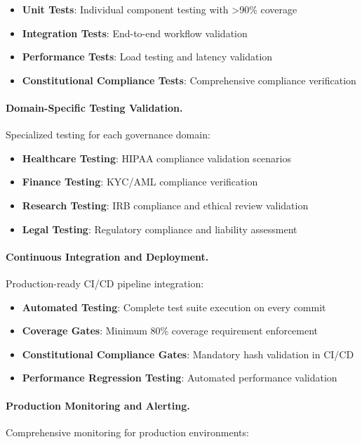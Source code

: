 \documentclass[manuscript,screen,9pt]{acmart}
\begin{document}
\begin{itemize}[itemsep=1pt,parsep=1pt]
    \item \textbf{Unit Tests}: Individual component testing with >90\% coverage
    \item \textbf{Integration Tests}: End-to-end workflow validation
    \item \textbf{Performance Tests}: Load testing and latency validation
    \item \textbf{Constitutional Compliance Tests}: Comprehensive compliance verification
\end{itemize}

\paragraph{Domain-Specific Testing Validation.}
Specialized testing for each governance domain:

\begin{itemize}[itemsep=1pt,parsep=1pt]
    \item \textbf{Healthcare Testing}: HIPAA compliance validation scenarios
    \item \textbf{Finance Testing}: KYC/AML compliance verification
    \item \textbf{Research Testing}: IRB compliance and ethical review validation
    \item \textbf{Legal Testing}: Regulatory compliance and liability assessment
\end{itemize}

\paragraph{Continuous Integration and Deployment.}
Production-ready CI/CD pipeline integration:

\begin{itemize}[itemsep=1pt,parsep=1pt]
    \item \textbf{Automated Testing}: Complete test suite execution on every commit
    \item \textbf{Coverage Gates}: Minimum 80\% coverage requirement enforcement
    \item \textbf{Constitutional Compliance Gates}: Mandatory hash validation in CI/CD
    \item \textbf{Performance Regression Testing}: Automated performance validation
\end{itemize}

\paragraph{Production Monitoring and Alerting.}
Comprehensive monitoring for production environments:
\end{document}
